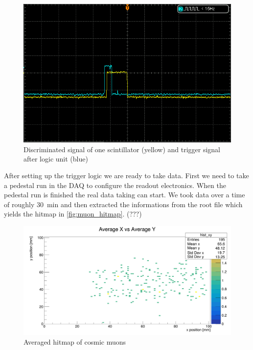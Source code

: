 \documentclass[sn-mathphys-num,iicol]{sn-jnl}
\theoremstyle{thmstyleone}
\theoremstyle{thmstyletwo}
\theoremstyle{thmstylethree}
\begin{document}
\begin{figure}
  \includegraphics[width=\linewidth]{figures/DS1Z_QuickPrint2_cropped.png}
  \caption{Discriminated signal of one scintillator (yellow) and trigger signal after logic unit (blue)}
  \label{fig:disc_signal}
\end{figure}

After setting up the trigger logic we are ready to take data. First we need to take a pedestal run in the DAQ to configure the readout electronics.
When the pedestal run is finished the real data taking can start. 
We took data over a time of roughly \SI{30}{\minute} and then extracted the informations from the root file which yields the hitmap in \autoref{fig:muon_hitmap}. (???)

\begin{figure}
  \includegraphics[width=\linewidth]{../src/elsa/finished_plots/muon_hitmap_avg.png}
  \caption{Averaged hitmap of cosmic muons}
  \label{fig:muon_hitmap}
\end{figure}
\end{document}
